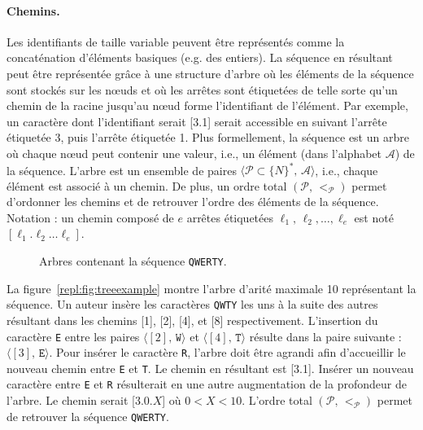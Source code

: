 \paragraph{Chemins.}

Les identifiants de taille variable peuvent être représentés comme la
concaténation d'éléments basiques (e.g. des entiers). La séquence en résultant
peut être représentée grâce à une structure d'arbre où les éléments de la
séquence sont stockés sur les nœuds et où les arrêtes sont étiquetées de telle
sorte qu'un chemin de la racine jusqu'au nœud forme l'identifiant de
l'élément. Par exemple, un caractère dont l'identifiant serait [3.1] serait
accessible en suivant l'arrête étiquetée 3, puis l'arrête étiquetée 1. Plus
formellement, la séquence est un arbre où chaque nœud peut contenir une valeur,
i.e., un élément (dans l'alphabet $\mathcal{A}$) de la séquence. L'arbre est un
ensemble de paires $\langle \mathcal{P}\subset \{N\}^*,\, \mathcal{A} \rangle$,
i.e., chaque élément est associé à un chemin. De plus, un ordre total
$(\mathcal{P},\, <_\mathcal{P})$ permet d'ordonner les chemins et de retrouver
l'ordre des éléments de la séquence. Notation : un chemin composé de $e$ arrêtes
étiquetées $\ell_1,\,\ell_2,\ldots,\ell_e$ est noté
$[\ell_1.\ell_2\ldots\ell_e]$.

\begin{figure}
  \centering
  \hspace{20pt}
  \caption[Arbres contenant une séquence répliquée]
  {Arbres contenant la séquence \texttt{QWERTY}.}
\end{figure}

La figure~\ref{repl:fig:treeexample} montre l'arbre d'arité maximale 10
représentant la séquence. Un auteur insère les caractères \texttt{QWTY} les uns
à la suite des autres résultant dans les chemins [1], [2], [4], et [8]
respectivement. L'insertion du caractère \texttt{E} entre les paires
$\langle [2],\, \texttt{W} \rangle$ et $\langle [4],\, \texttt{T} \rangle$
résulte dans la paire suivante : $\langle [3],\, \texttt{E} \rangle$. Pour
insérer le caractère \texttt{R}, l'arbre doit être agrandi afin d'accueillir le
nouveau chemin entre \texttt{E} et \texttt{T}. Le chemin en résultant est
[3.1]. Insérer un nouveau caractère entre \texttt{E} et \texttt{R} résulterait
en une autre augmentation de la profondeur de l'arbre. Le chemin serait
[3.0.$X$] où $0<X<10$. L'ordre total $(\mathcal{P},\, <_\mathcal{P})$ permet de
retrouver la séquence \texttt{QWERTY}.


